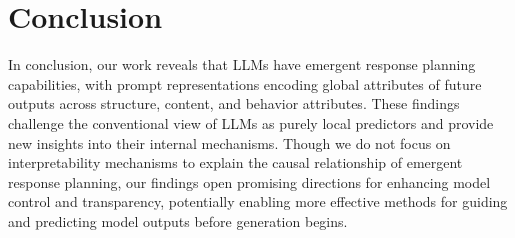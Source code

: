 \section{Conclusion}
In conclusion, our work reveals that LLMs have emergent response planning capabilities, with prompt representations encoding global attributes of future outputs across structure, content, and behavior attributes. These findings challenge the conventional view of LLMs as purely local predictors and provide new insights into their internal mechanisms. 
Though we do not focus on interpretability mechanisms to explain the causal relationship of emergent response planning, our findings open promising directions for enhancing model control and transparency, potentially enabling more effective methods for guiding and predicting model outputs before generation begins.